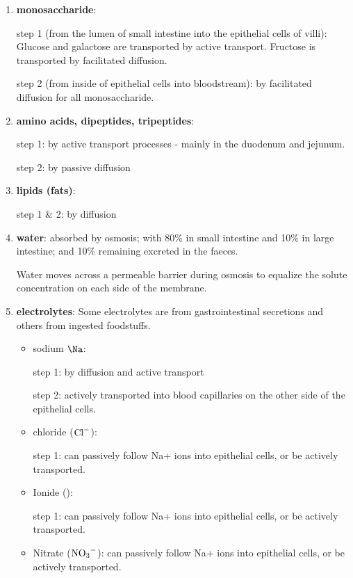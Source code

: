\begin{enumerate}
  \item {\bf monosaccharide}: 
  
  step 1 (from the lumen of small intestine into the epithelial cells of villi): 
  Glucose and galactose are transported by active transport. Fructose is
  transported by facilitated diffusion.
  
  step 2 (from inside of epithelial cells into bloodstream): by facilitated
  diffusion for all monosaccharide.
  
  \item {\bf amino acids, dipeptides, tripeptides}: 
  
  step 1: by  active transport processes - mainly in the duodenum and jejunum.
  
  step 2: by passive diffusion
  
  \item {\bf lipids (fats)}: 
  
  step 1 \& 2: by diffusion
  
  \item {\bf water}: absorbed by osmosis; with 80\% in small intestine and 10\%
  in large intestine; and 10\%  remaining excreted in the faeces.
  
Water moves across a permeable barrier during osmosis to equalize the solute
concentration on each side of the membrane.

  \item {\bf electrolytes}: Some electrolytes are from gastrointestinal
  secretions and others from ingested foodstuffs.
  
  \begin{itemize}
    \item sodium $\Na$: 
    
  step 1: by diffusion and active transport
  
  step 2: actively transported into blood capillaries on the other side of the
  epithelial cells.
  
    \item chloride (${\text{Cl}^{-}}$):
    
  step 1: can passively follow Na+ ions into epithelial cells, or be actively
  transported.
  
    \item  Ionide (): 
    
  step 1: can passively follow Na+ ions into epithelial
    cells, or be actively transported.
    
    \item Nitrate ($\ce{NO_3^-}$): can passively follow Na+ ions into epithelial
    cells, or be actively transported.
    

\end{itemize}
\end{enumerate}

